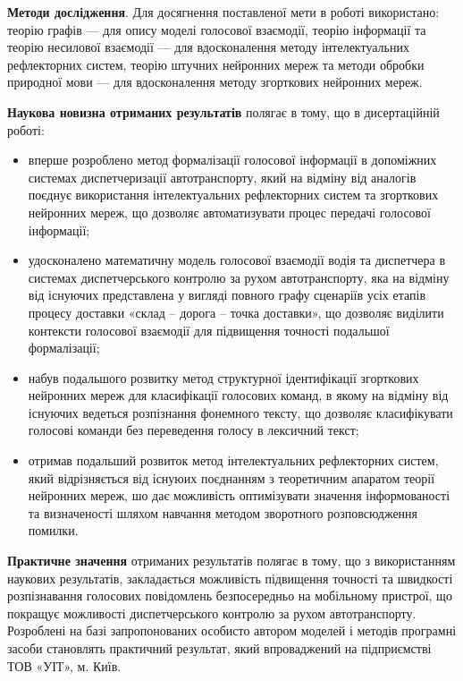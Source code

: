 \textbf{Методи дослідження}. Для досягнення поставленої мети в роботі використано: теорію графів --- для опису моделі голосової взаємодії, теорію інформації та теорію несилової взаємодії --- для вдосконалення методу інтелектуальних рефлекторних систем, теорію штучних нейронних мереж та методи обробки природної мови --- для вдосконалення методу згорткових нейронних мереж.

\textbf{Наукова новизна отриманих результатів} полягає в тому, що в дисертаційній роботі:

\begin{itemize}
	\item вперше розроблено метод формалізації голосової інформації в допоміжних системах диспетчеризації автотранспорту, який на відміну від аналогів поєднує використання інтелектуальних рефлекторних систем та згорткових нейронних мереж, що дозволяє автоматизувати процес передачі голосової інформації;
	\item удосконалено математичну модель голосової взаємодії водія та диспетчера в системах диспетчерського контролю за рухом автотранспорту, яка на відміну від існуючих представлена у вигляді повного графу сценаріїв усіх етапів процесу доставки «склад – дорога – точка доставки», що дозволяє виділити контексти голосової взаємодії для підвищення точності подальшої формалізації;
	\item набув подальшого розвитку метод структурної ідентифікації згорткових нейронних мереж для класифікації голосових команд, в якому на відміну від існуючих ведеться розпізнання фонемного тексту, що дозволяє класифікувати голосові команди без переведення голосу в лексичний текст;
	\item отримав подальший розвиток метод інтелектуальних рефлекторних систем, який відрізняється від існуюих поєднанням з теоретичним апаратом теорії нейронних мереж, шо дає можливість оптимізувати значення інформованості та визначеності шляхом навчання методом зворотного розповсюдження помилки.
\end{itemize}

\textbf{Практичне значення} отриманих результатів полягає в тому, що з використанням наукових результатів, закладається можливість підвищення точності та швидкості розпізнавання голосових повідомлень безпосередньо на мобільному пристрої, що покращує можливості диспетчерського контролю за рухом автотранспорту. Розроблені на базі запропонованих особисто автором моделей і методів програмні засоби становлять практичний результат, який впроваджений на підприємстві ТОВ «УІТ», м. Київ.

